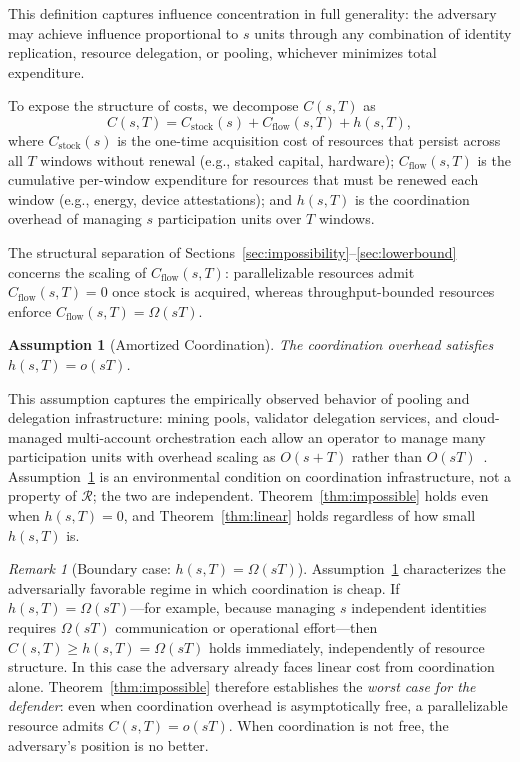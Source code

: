 \documentclass[10pt,journal,compsoc]{IEEEtran}
\newtheorem{assumption}[theorem]{Assumption}
\theoremstyle{remark}
\newtheorem{remark}{Remark}[section]
\begin{document}
	This definition captures influence concentration in
	full generality: the adversary may achieve influence
	proportional to $s$ units through any combination
	of identity replication, resource delegation, or
	pooling, whichever minimizes total expenditure.
	
	To expose the structure of costs, we decompose
	$C(s, T)$ as
	\begin{equation}
		C(s, T) = C_{\mathrm{stock}}(s)
		+ C_{\mathrm{flow}}(s, T)
		+ h(s, T),
	\end{equation}
	where $C_{\mathrm{stock}}(s)$ is the one-time
	acquisition cost of resources that persist across
	all $T$ windows without renewal (e.g., staked capital,
	hardware); $C_{\mathrm{flow}}(s, T)$ is the cumulative
	per-window expenditure for resources that must be
	renewed each window (e.g., energy, device attestations);
	and $h(s, T)$ is the coordination overhead of managing
	$s$ participation units over $T$ windows.
	
	The structural separation of
	Sections~\ref{sec:impossibility}--\ref{sec:lowerbound}
	concerns the scaling of $C_{\mathrm{flow}}(s, T)$:
	parallelizable resources admit
	$C_{\mathrm{flow}}(s, T) = 0$ once stock is acquired,
	whereas throughput-bounded resources enforce
	$C_{\mathrm{flow}}(s, T) = \Omega(sT)$.
	
	\begin{assumption}[Amortized Coordination]
		\label{asm:coordination}
		The coordination overhead satisfies $h(s, T) = o(sT)$.
	\end{assumption}
	
	This assumption captures the empirically observed
	behavior of pooling and delegation infrastructure:
	mining pools, validator delegation services, and
	cloud-managed multi-account orchestration each allow
	an operator to manage many participation units with
	overhead scaling as $O(s + T)$ rather than
	$O(sT)$~\cite{rosenfeld2011analysis,bonneau2015sok,
		saleh2021blockchain}.
	Assumption~\ref{asm:coordination} is an environmental
	condition on coordination infrastructure, not a
	property of $\mathcal{R}$; the two are independent.
	Theorem~\ref{thm:impossible} holds even when
	$h(s, T) = 0$, and Theorem~\ref{thm:linear} holds
	regardless of how small $h(s, T)$ is.
	
	\begin{remark}[Boundary case: $h(s,T) = \Omega(sT)$]
		\label{rem:coord_linear}
		Assumption~\ref{asm:coordination} characterizes
		the adversarially favorable regime in which
		coordination is cheap.
		If $h(s,T) = \Omega(sT)$---for example, because
		managing $s$ independent identities requires
		$\Omega(sT)$ communication or operational
		effort---then $C(s,T) \geq h(s,T) = \Omega(sT)$
		holds immediately, independently of resource
		structure.
		In this case the adversary already faces linear
		cost from coordination alone.
		Theorem~\ref{thm:impossible} therefore establishes
		the \emph{worst case for the defender}: even when
		coordination overhead is asymptotically free,
		a parallelizable resource admits $C(s,T) = o(sT)$.
		When coordination is not free, the adversary's
		position is no better.
	\end{remark}
	
\end{document}
